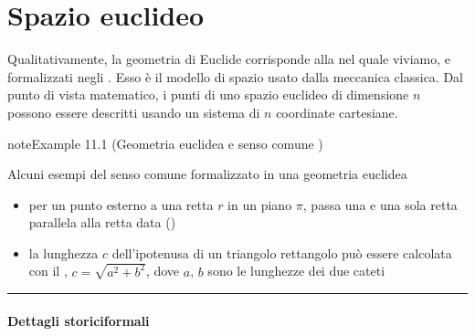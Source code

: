 \documentclass[letterpaper,10pt,italian]{jupyterBook}
\begin{document}
\chapter{Spazio euclideo}
\label{\detokenize{ch/analytic_geometry/euclidean_space:spazio-euclideo}}\label{\detokenize{ch/analytic_geometry/euclidean_space:geometry-analytic-euclidean-space}}\label{\detokenize{ch/analytic_geometry/euclidean_space::doc}}
\sphinxAtStartPar
Qualitativamente, la geometria di Euclide corrisponde alla  nel quale viviamo, e formalizzati negli . Esso è il modello di spazio usato dalla meccanica classica. Dal punto di vista matematico, i punti di uno spazio euclideo di dimensione \(n\) possono essere descritti usando un sistema di \(n\) coordinate cartesiane.
\label{ch/analytic_geometry/euclidean_space:ex-euclidean-space-common-sense}
\begin{sphinxadmonition}{note}{Example 11.1 (Geometria euclidea e senso comune )}



\sphinxAtStartPar
Alcuni esempi del senso comune formalizzato in una geometria euclidea
\begin{itemize}
\item {} 
\sphinxAtStartPar
per un punto esterno a una retta \(r\) in un piano \(\pi\), passa una e una sola retta parallela alla retta data ()

\item {} 
\sphinxAtStartPar
la lunghezza \(c\) dell’ipotenusa di un triangolo rettangolo può essere calcolata con il , \(c = \sqrt{a^2 + b^2}\), dove \(a\), \(b\) sono le lunghezze dei due cateti

\end{itemize}
\end{sphinxadmonition}


\bigskip\hrule\bigskip

\subsubsection*{Dettagli storici\sphinxhyphen{}formali}
\end{document}

